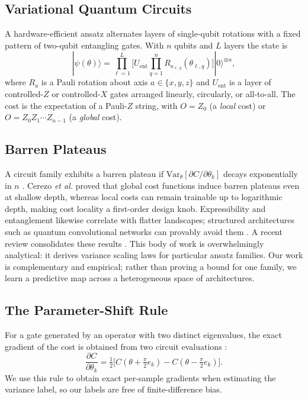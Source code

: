 \documentclass{ieeeaccess}
\begin{document}
\subsection{Variational Quantum Circuits}
A hardware-efficient ansatz \cite{kandala2017hardware} alternates layers of
single-qubit rotations with a fixed pattern of two-qubit entangling gates. With
$n$ qubits and $L$ layers the state is
\begin{equation}
|\psi(\theta)\rangle = \prod_{\ell=1}^{L}
  \Big[ U_{\mathrm{ent}} \prod_{q=1}^{n} R_{a_{\ell,q}}(\theta_{\ell,q}) \Big]
  |0\rangle^{\otimes n},
\end{equation}
where $R_a$ is a Pauli rotation about axis $a\in\{x,y,z\}$ and $U_{\mathrm{ent}}$
is a layer of controlled-$Z$ or controlled-$X$ gates arranged linearly, circularly,
or all-to-all. The cost is the expectation of a Pauli-$Z$ string, with $O=Z_0$ (a
\emph{local} cost) or $O=Z_0Z_1\cdots Z_{n-1}$ (a \emph{global} cost).

\subsection{Barren Plateaus}
A circuit family exhibits a barren plateau if
$\mathrm{Var}_\theta[\partial C/\partial\theta_k]$ decays exponentially in $n$
\cite{mcclean2018barren}. Cerezo \emph{et al.} \cite{cerezo2021cost} proved that
global cost functions induce barren plateaus even at shallow depth, whereas local
costs can remain trainable up to logarithmic depth, making cost locality a
first-order design knob. Expressibility \cite{holmes2022expressibility} and
entanglement likewise correlate with flatter landscapes; structured architectures
such as quantum convolutional networks can provably avoid them
\cite{pesah2021absence}. A recent review consolidates these results
\cite{larocca2025barren}. This body of work is overwhelmingly analytical: it
derives variance scaling laws for particular ansatz families. Our work is
complementary and empirical; rather than proving a bound for one family, we learn a
predictive map across a heterogeneous space of architectures.

\subsection{The Parameter-Shift Rule}
For a gate generated by an operator with two distinct eigenvalues, the exact
gradient of the cost is obtained from two circuit evaluations
\cite{mitarai2018circuit,schuld2019param}:
\begin{equation}
\frac{\partial C}{\partial\theta_k}
  = \tfrac{1}{2}\big[C(\theta + \tfrac{\pi}{2}e_k)
  - C(\theta - \tfrac{\pi}{2}e_k)\big].
\end{equation}
We use this rule to obtain exact per-sample gradients when estimating the variance
label, so our labels are free of finite-difference bias.
\end{document}
